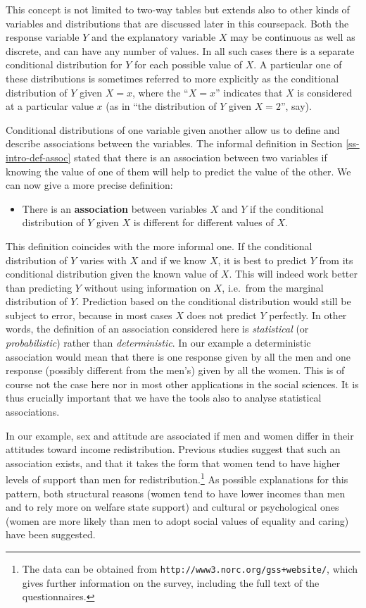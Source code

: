 \documentclass[11pt,a4paper,openany]{book}
\providecommand{\tightlist}{%
  \setlength{\itemsep}{0pt}\setlength{\parskip}{0pt}}
\let\rmarkdownfootnote\footnote%
\def\footnote{\protect\rmarkdownfootnote}
\begin{document}
This concept is not limited to two-way tables but extends also to other
kinds of variables and distributions that are discussed later in this
coursepack. Both the response variable \(Y\) and the explanatory
variable \(X\) may be continuous as well as discrete, and can have any
number of values. In all such cases there is a separate conditional
distribution for \(Y\) for each possible value of \(X\). A particular
one of these distributions is sometimes referred to more explicitly as
the conditional distribution of \(Y\) given \(X=x\), where the
``\(X=x\)'' indicates that \(X\) is considered at a particular value
\(x\) (as in ``the distribution of \(Y\) given \(X=2\)'', say).

Conditional distributions of one variable given another allow us to
define and describe associations between the variables. The informal
definition in Section \ref{ss-intro-def-assoc} stated that there is an
association between two variables if knowing the value of one of them
will help to predict the value of the other. We can now give a more
precise definition:

\begin{itemize}
\tightlist
\item
  There is an \textbf{association} between variables \(X\) and \(Y\) if
  the conditional distribution of \(Y\) given \(X\) is different for
  different values of \(X\).
\end{itemize}

This definition coincides with the more informal one. If the conditional
distribution of \(Y\) varies with \(X\) and if we know \(X\), it is best
to predict \(Y\) from its conditional distribution given the known value
of \(X\). This will indeed work better than predicting \(Y\) without
using information on \(X\), i.e.~from the marginal distribution of
\(Y\). Prediction based on the conditional distribution would still be
subject to error, because in most cases \(X\) does not predict \(Y\)
perfectly. In other words, the definition of an association considered
here is \emph{statistical} (or \emph{probabilistic}) rather than
\emph{deterministic}. In our example a deterministic association would
mean that there is one response given by all the men and one response
(possibly different from the men's) given by all the women. This is of
course not the case here nor in most other applications in the social
sciences. It is thus crucially important that we have the tools also to
analyse statistical associations.

In our example, sex and attitude are associated if men and women differ
in their attitudes toward income redistribution. Previous studies
suggest that such an association exists, and that it takes the form that
women tend to have higher levels of support than men for
redistribution.\footnote{The data can be obtained from
  \texttt{http://www3.norc.org/gss+website/}, which gives further
  information on the survey, including the full text of the
  questionnaires.} As possible explanations for this pattern, both
structural reasons (women tend to have lower incomes than men and to
rely more on welfare state support) and cultural or psychological ones
(women are more likely than men to adopt social values of equality and
caring) have been suggested.
\end{document}
